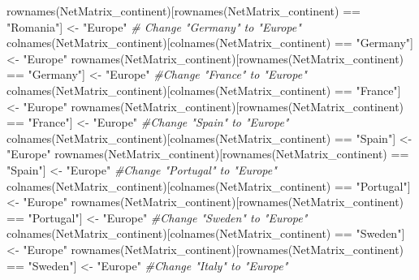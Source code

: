 \documentclass[
]{article}
\newenvironment{Shaded}{\begin{snugshade}}{\end{snugshade}}
\newcommand{\CommentTok}[1]{\textcolor[rgb]{0.56,0.35,0.01}{\textit{#1}}}
\newcommand{\FunctionTok}[1]{\textcolor[rgb]{0.00,0.00,0.00}{#1}}
\newcommand{\NormalTok}[1]{#1}
\newcommand{\OtherTok}[1]{\textcolor[rgb]{0.56,0.35,0.01}{#1}}
\newcommand{\SpecialCharTok}[1]{\textcolor[rgb]{0.00,0.00,0.00}{#1}}
\newcommand{\StringTok}[1]{\textcolor[rgb]{0.31,0.60,0.02}{#1}}
\begin{document}
\begin{Shaded}
\begin{Highlighting}[]
\FunctionTok{rownames}\NormalTok{(NetMatrix\_continent)[}\FunctionTok{rownames}\NormalTok{(NetMatrix\_continent) }\SpecialCharTok{==} \StringTok{"Romania"}\NormalTok{] }\OtherTok{\textless{}{-}} \StringTok{"Europe"}
\CommentTok{\# Change "Germany" to "Europe"}
\FunctionTok{colnames}\NormalTok{(NetMatrix\_continent)[}\FunctionTok{colnames}\NormalTok{(NetMatrix\_continent) }\SpecialCharTok{==} \StringTok{"Germany"}\NormalTok{] }\OtherTok{\textless{}{-}} \StringTok{"Europe"}
\FunctionTok{rownames}\NormalTok{(NetMatrix\_continent)[}\FunctionTok{rownames}\NormalTok{(NetMatrix\_continent) }\SpecialCharTok{==} \StringTok{"Germany"}\NormalTok{] }\OtherTok{\textless{}{-}} \StringTok{"Europe"}
\CommentTok{\#Change "France" to "Europe"}
\FunctionTok{colnames}\NormalTok{(NetMatrix\_continent)[}\FunctionTok{colnames}\NormalTok{(NetMatrix\_continent) }\SpecialCharTok{==} \StringTok{"France"}\NormalTok{] }\OtherTok{\textless{}{-}} \StringTok{"Europe"}
\FunctionTok{rownames}\NormalTok{(NetMatrix\_continent)[}\FunctionTok{rownames}\NormalTok{(NetMatrix\_continent) }\SpecialCharTok{==} \StringTok{"France"}\NormalTok{] }\OtherTok{\textless{}{-}} \StringTok{"Europe"}
\CommentTok{\#Change "Spain" to "Europe"}
\FunctionTok{colnames}\NormalTok{(NetMatrix\_continent)[}\FunctionTok{colnames}\NormalTok{(NetMatrix\_continent) }\SpecialCharTok{==} \StringTok{"Spain"}\NormalTok{] }\OtherTok{\textless{}{-}} \StringTok{"Europe"}
\FunctionTok{rownames}\NormalTok{(NetMatrix\_continent)[}\FunctionTok{rownames}\NormalTok{(NetMatrix\_continent) }\SpecialCharTok{==} \StringTok{"Spain"}\NormalTok{] }\OtherTok{\textless{}{-}} \StringTok{"Europe"}
\CommentTok{\#Change "Portugal" to "Europe"}
\FunctionTok{colnames}\NormalTok{(NetMatrix\_continent)[}\FunctionTok{colnames}\NormalTok{(NetMatrix\_continent) }\SpecialCharTok{==} \StringTok{"Portugal"}\NormalTok{] }\OtherTok{\textless{}{-}} \StringTok{"Europe"}
\FunctionTok{rownames}\NormalTok{(NetMatrix\_continent)[}\FunctionTok{rownames}\NormalTok{(NetMatrix\_continent) }\SpecialCharTok{==} \StringTok{"Portugal"}\NormalTok{] }\OtherTok{\textless{}{-}} \StringTok{"Europe"}
\CommentTok{\#Change "Sweden" to "Europe"}
\FunctionTok{colnames}\NormalTok{(NetMatrix\_continent)[}\FunctionTok{colnames}\NormalTok{(NetMatrix\_continent) }\SpecialCharTok{==} \StringTok{"Sweden"}\NormalTok{] }\OtherTok{\textless{}{-}} \StringTok{"Europe"}
\FunctionTok{rownames}\NormalTok{(NetMatrix\_continent)[}\FunctionTok{rownames}\NormalTok{(NetMatrix\_continent) }\SpecialCharTok{==} \StringTok{"Sweden"}\NormalTok{] }\OtherTok{\textless{}{-}} \StringTok{"Europe"}
\CommentTok{\#Change "Italy" to "Europe"}

\end{Highlighting}
\end{Shaded}
\end{document}
